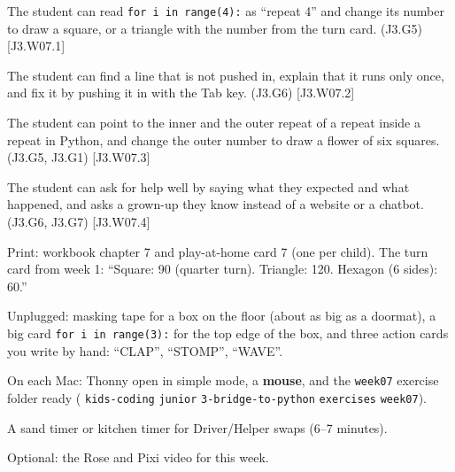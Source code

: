 
\begin{objectives}
  \item The student can read \texttt{for i in range(4):} as \enquote{repeat 4} and change its number to draw a square, or a triangle with the number from the turn card. (J3.G5) [J3.W07.1]
  \item The student can find a line that is not pushed in, explain that it runs only once, and fix it by pushing it in with the Tab key. (J3.G6) [J3.W07.2]
  \item The student can point to the inner and the outer repeat of a repeat inside a repeat in Python, and change the outer number to draw a flower of six squares. (J3.G5, J3.G1) [J3.W07.3]
  \item The student can ask for help well by saying what they expected and what happened, and asks a grown-up they know instead of a website or a chatbot. (J3.G6, J3.G7) [J3.W07.4]
\end{objectives}

\begin{materials}
  \item Print: workbook chapter 7 and play-at-home card 7 (one per child). The turn card from week 1: \enquote{Square: 90 (quarter turn). Triangle: 120. Hexagon (6 sides): 60.}
  \item Unplugged: masking tape for a box on the floor (about as big as a doormat), a big card \texttt{for i in range(3):} for the top edge of the box, and three action cards you write by hand: \enquote{CLAP}, \enquote{STOMP}, \enquote{WAVE}.
  \item On each Mac: Thonny open in simple mode, a \textbf{mouse}, and the \texttt{week07} exercise folder ready ( \textrightarrow{} \texttt{kids-coding} \textrightarrow{} \texttt{junior} \textrightarrow{} \texttt{3-bridge-to-python} \textrightarrow{} \texttt{exercises} \textrightarrow{} \texttt{week07}).
  \item A sand timer or kitchen timer for Driver/Helper swaps (6--7 minutes).
  \item Optional: the Rose and Pixi video for this week.
\end{materials}

